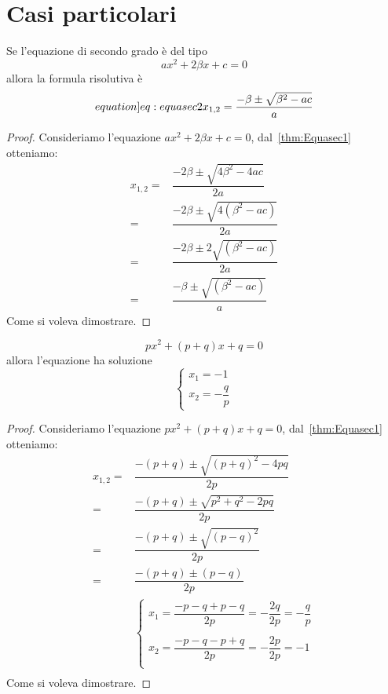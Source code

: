 \section{Casi particolari}
\begin{thm}\label{thm:Equasec2}
	Se l'equazione di secondo grado è del tipo\[ax^2+2\beta x+c=0 \] allora la formula risolutiva è \begin{equation*}\label[equation]{eq:equasec2}
	x_{1,2}=\dfrac{-\beta\pm\sqrt{\beta^2- ac}}{a}
	\end{equation*}
\end{thm}
\begin{proof}
Consideriamo l'equazione $ax^2+2\beta x+c=0$, dal~\cref{thm:Equasec1} otteniamo:
\begin{align*}
x_{1,2}=&\dfrac{-2\beta\pm\sqrt{4\beta^2-4ac}}{2a}\\
=&\dfrac{-2\beta\pm\sqrt{4(\beta^2-ac)}}{2a}\\
=&\dfrac{-2\beta\pm 2\sqrt{(\beta^2-ac)}}{2a}\\
=&\dfrac{-\beta\pm \sqrt{(\beta^2-ac)}}{a}
\end{align*}
Come si voleva dimostrare.
\end{proof}
\begin{thm}\label{thm:Equasec3}
	\[px^2+(p+q)x+q=0 \] allora l'equazione ha soluzione \[\begin{cases}
	x_1=-1\\ x_2=-\dfrac{q}{p}
	\end{cases}\]
\end{thm}
\begin{proof}
	Consideriamo l'equazione $px^2+(p+q) x+q=0$, dal~\cref{thm:Equasec1} otteniamo:
	\begin{align*}
	x_{1,2}=&\dfrac{-(p+q)\pm\sqrt{(p+q)^2-4pq}}{2p}\\
	=&\dfrac{-(p+q)\pm\sqrt{p^2+q^2-2pq}}{2p}\\
	=&\dfrac{-(p+q)\pm\sqrt{(p-q)^2}}{2p}\\
	=&\dfrac{-(p+q)\pm(p-q)}{2p}\\
	&\begin{cases}
	x_1=\dfrac{-p-q+p-q}{2p}=-\dfrac{2q}{2p}=-\dfrac{q}{p}\\ \\
	x_2=\dfrac{-p-q-p+q}{2p}=-\dfrac{2p}{2p}=-1\\
	\end{cases}\\
	\end{align*}
	Come si voleva dimostrare.
\end{proof}
